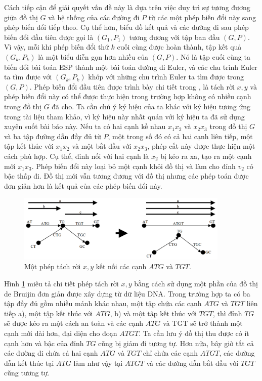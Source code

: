 \documentclass[14pt, a4paper]{article}
\numberwithin{equation}{section}
\numberwithin{figure}{section}
\numberwithin{dl}{section}
\numberwithin{md}{section}
\numberwithin{bd}{section}
\numberwithin{dn}{section}
\numberwithin{hq}{section}
\begin{document}
    Cách tiếp cận để giải quyết vấn đề này là dựa trên việc duy trì sự tương đương giữa đồ thị $G$ và hệ thống của các đường đi $P$ từ các một phép biến đổi này sang phép biến đổi tiếp theo.
    Cụ thể hơn, biểu đồ kết quả và các đường đi sau phép biến đổi đầu tiên được gọi là $(G_1, P_1)$ tương đương với tập ban đầu $(G, P)$.
    Vì vậy, mỗi khi phép biến đổi thứ $k$ cuối cùng được hoàn thành, tập kết quả $(G_k, P_k)$ là một biểu diễn gọn hơn nhiều của $(G, P)$.
    Nó là tập cuối cùng ta biến đổi bài toán ESP thành một bài toán đường đi Euler, và các chu trình Euler ta tìm được với $(G_k, P_k)$ khớp với những chu trình Euler ta tìm được trong $(G, P)$.
    Phép biến đổi đầu tiên được trình bày chi tiết trong \cite{pevzner2001eulerian}, \cite{pevzner2001new} là tách rời $x, y$ và phép biến đổi này có thể được thực hiện trong trường hợp không có nhiều cạnh trong đồ thị $G$ đã cho.
    Ta cần chú ý ký hiệu của ta khác với ký hiệu tương ứng trong tài liệu tham khảo, vì ký hiệu này nhất quán với ký hiệu ta đã sử dụng xuyên suốt bài báo này.
    Nếu ta có hai cạnh kề nhau $x_1 x_2$ và $x_2 x_3$ trong đồ thị $G$ và ba tập đường dẫn đầy đủ từ $P$, một trong số đó có cả hai cạnh liên tiếp, một tập kết thúc với $x_1 x_2$ và một bắt đầu với $x_2 x_3$, phép cắt này được thực hiện một cách phù hợp. Cụ thể, đỉnh nối với hai cạnh là $x_2$ bị kéo ra xa, tạo ra một cạnh mới $x_1 x_3$.
    Phép biến đổi này loại bỏ một cạnh khỏi đồ thị và làm cho đỉnh $v_2$ có bậc thấp đi.
    Đồ thị mới vẫn tương đương với đồ thị nhưng các phép toán được đơn giản hơn là kết quả của các phép biến đổi này.

    \begin{figure}[h!]
        \centering
        \includegraphics[width=0.9\textwidth]{6.png}
        \caption{Một phép tách rời $x, y$ kết nối các cạnh $ATG$ và $TGT$.}
        \label{fig:6}
    \end{figure}

    Hình \ref{fig:6} miêu tả chi tiết phép tách rời $x, y$ bằng cách sử dụng một phần của đồ thị de Bruijin đơn giản được xây dựng từ dữ liệu DNA.
    Trong trường hợp ta có ba tập đầy đủ gồm nhiều mảnh khác nhau, một tập chứa các cạnh $ATG$ và $TGT$  liên tiếp a), một tập kết thúc với $ATG$, b) và một tập kết thúc với $TGT$, thì đỉnh $TG$ sẽ được kéo ra một cách an toàn và các cạnh $ATG$ và TGT sẽ trở thành một cạnh mới dài hơn, đại diện cho đoạn $ATGT$.
    Ta cần lưu ý đồ thị thu được có ít cạnh hơn và bậc của đỉnh $TG$ cũng bị giảm đi tương tự.
    Hơn nữa, bây giờ tất cả các đường đi chứa cả hai cạnh $ATG$ và $TGT$ chỉ chứa các cạnh $ATGT$, các đường dẫn kết thúc tại $ATG$ làm như vậy tại $ATGT$ và các đường dẫn bắt đầu với $TGT$ cũng tương tự.
\end{document}
